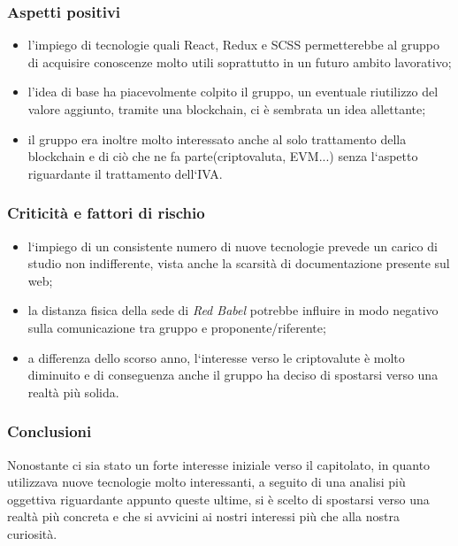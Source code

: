 \subsubsection{Aspetti positivi} 
\begin{itemize}
	\item l'impiego di tecnologie quali React, Redux e SCSS permetterebbe al gruppo di acquisire conoscenze molto utili soprattutto in un futuro ambito lavorativo;
	
	\item l'idea di base ha piacevolmente colpito il gruppo, un eventuale riutilizzo del valore aggiunto, tramite una blockchain, ci è sembrata un idea allettante;
	
	\item il gruppo era inoltre molto interessato anche al solo trattamento della blockchain e di ciò che ne fa parte(criptovaluta, EVM...) senza l`aspetto riguardante il trattamento dell`IVA.
\end{itemize}

\subsubsection{Criticità e fattori di rischio}

\begin{itemize}
	\item l`impiego di un consistente numero di nuove tecnologie prevede un carico di studio non indifferente, vista anche la scarsità di documentazione presente sul web;
	
	\item la distanza fisica della sede di \textit{Red Babel} potrebbe influire in modo negativo sulla comunicazione tra gruppo e proponente/riferente; 
	
	\item a differenza dello scorso anno, l`interesse verso le criptovalute è molto diminuito e di conseguenza anche il gruppo ha deciso di spostarsi verso una realtà più solida.  
\end{itemize}

\subsubsection{Conclusioni}
Nonostante ci sia stato un forte interesse iniziale verso il capitolato, in quanto utilizzava nuove tecnologie molto interessanti, a seguito di una analisi più oggettiva riguardante appunto queste ultime, si è scelto di spostarsi verso una realtà più concreta e che si avvicini ai nostri interessi più che alla nostra curiosità.